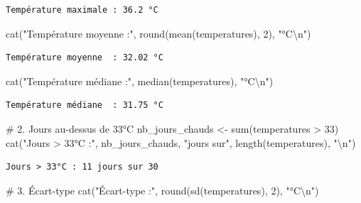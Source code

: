 \documentclass[
  french,
  11pt,
  a4paper,
]{article}
\newenvironment{Shaded}{}{}
\newcommand{\CommentTok}[1]{\textcolor[rgb]{0.42,0.45,0.49}{#1}}
\newcommand{\DecValTok}[1]{\textcolor[rgb]{0.00,0.36,0.77}{#1}}
\newcommand{\FunctionTok}[1]{\textcolor[rgb]{0.44,0.26,0.76}{#1}}
\newcommand{\NormalTok}[1]{\textcolor[rgb]{0.14,0.16,0.18}{#1}}
\newcommand{\OtherTok}[1]{\textcolor[rgb]{0.44,0.26,0.76}{#1}}
\newcommand{\SpecialCharTok}[1]{\textcolor[rgb]{0.00,0.36,0.77}{#1}}
\newcommand{\StringTok}[1]{\textcolor[rgb]{0.01,0.18,0.38}{#1}}
\begin{document}
\begin{verbatim}
Température maximale : 36.2 °C
\end{verbatim}

\begin{Shaded}
\begin{Highlighting}[]
\FunctionTok{cat}\NormalTok{(}\StringTok{"Température moyenne  :"}\NormalTok{, }\FunctionTok{round}\NormalTok{(}\FunctionTok{mean}\NormalTok{(temperatures), }\DecValTok{2}\NormalTok{), }\StringTok{"°C}\SpecialCharTok{\textbackslash{}n}\StringTok{"}\NormalTok{)}
\end{Highlighting}
\end{Shaded}

\begin{verbatim}
Température moyenne  : 32.02 °C
\end{verbatim}

\begin{Shaded}
\begin{Highlighting}[]
\FunctionTok{cat}\NormalTok{(}\StringTok{"Température médiane  :"}\NormalTok{, }\FunctionTok{median}\NormalTok{(temperatures), }\StringTok{"°C}\SpecialCharTok{\textbackslash{}n}\StringTok{"}\NormalTok{)}
\end{Highlighting}
\end{Shaded}

\begin{verbatim}
Température médiane  : 31.75 °C
\end{verbatim}

\begin{Shaded}
\begin{Highlighting}[]
\CommentTok{\# 2. Jours au{-}dessus de 33°C}
\NormalTok{nb\_jours\_chauds }\OtherTok{\textless{}{-}} \FunctionTok{sum}\NormalTok{(temperatures }\SpecialCharTok{\textgreater{}} \DecValTok{33}\NormalTok{)}
\FunctionTok{cat}\NormalTok{(}\StringTok{"Jours \textgreater{} 33°C :"}\NormalTok{, nb\_jours\_chauds, }\StringTok{"jours sur"}\NormalTok{, }\FunctionTok{length}\NormalTok{(temperatures), }\StringTok{"}\SpecialCharTok{\textbackslash{}n}\StringTok{"}\NormalTok{)}
\end{Highlighting}
\end{Shaded}

\begin{verbatim}
Jours > 33°C : 11 jours sur 30 
\end{verbatim}

\begin{Shaded}
\begin{Highlighting}[]
\CommentTok{\# 3. Écart{-}type}
\FunctionTok{cat}\NormalTok{(}\StringTok{"Écart{-}type :"}\NormalTok{, }\FunctionTok{round}\NormalTok{(}\FunctionTok{sd}\NormalTok{(temperatures), }\DecValTok{2}\NormalTok{), }\StringTok{"°C}\SpecialCharTok{\textbackslash{}n}\StringTok{"}\NormalTok{)}
\end{Highlighting}
\end{Shaded}
\end{document}
